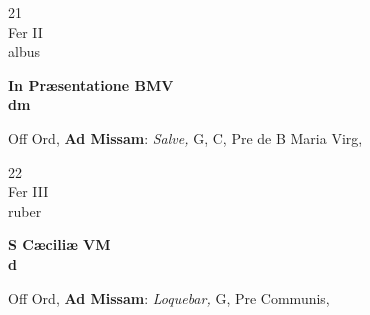 \documentclass[10pt, openany]{book}
\begin{document}
        \begin{center}
            \begin{minipage}{3.5in}
                \vspace{2em}
                \begin{minipage}{0.5in}
                    {\Huge 21} \\
                    {\normalsize Fer II} \\
                    {\normalsize albus}
                \end{minipage}
                \begin{minipage}{3.0in}
                    \textbf{ \large In Præsentatione BMV \\
                    \textnormal{\normalsize dm}} \\ 
                \end{minipage}
                \begin{justify}Off Ord, \textbf{Ad Missam}: \textit{Salve,} G, C, Pre de B Maria Virg,  
                \end{justify}
            \end{minipage}
        \end{center}
    
        \begin{center}
            \begin{minipage}{3.5in}
                \vspace{2em}
                \begin{minipage}{0.5in}
                    {\Huge 22} \\
                    {\normalsize Fer III} \\
                    {\normalsize ruber}
                \end{minipage}
                \begin{minipage}{3.0in}
                    \textbf{ \large S Cæciliæ VM \\
                    \textnormal{\normalsize d}} \\ 
                \end{minipage}
                \begin{justify}Off Ord, \textbf{Ad Missam}: \textit{Loquebar,} G, Pre Communis,  
                \end{justify}
            \end{minipage}
        \end{center}
    
\end{document}

